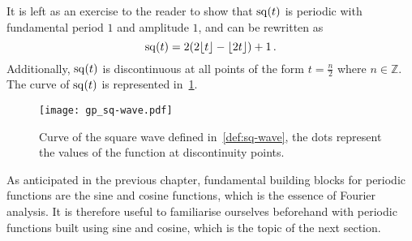 It is left as an exercise to the reader to show that $\operatorname{sq}(t)$ is periodic with
fundamental period $1$ and amplitude $1$, and can be rewritten as
\begin{equation}
  \operatorname{sq}(t)=2(2\lfloor t\rfloor-\lfloor 2t\rfloor)+1\,.
\end{equation}
Additionally, $\operatorname{sq}(t)$ is discontinuous at all points of the form $t=\frac{n}{2}$ where
$n\in\mathbb{Z}$. The curve of $\operatorname{sq}(t)$ is represented in~\cref{fig:sq-wave}.
\begin{figure}[t]
  \centering
  \texttt{[image: gp\_sq-wave.pdf]}
  \caption{Curve of the square wave defined in~\cref{def:sq-wave}, the dots represent the
  values of the function at discontinuity points.}
  \label{fig:sq-wave}
\end{figure}

As anticipated in the previous chapter, fundamental building blocks for periodic functions
are the sine and cosine functions, which is the essence of Fourier analysis. It is
therefore useful to familiarise ourselves beforehand with periodic functions built using
sine and cosine, which is the topic of the next section.
